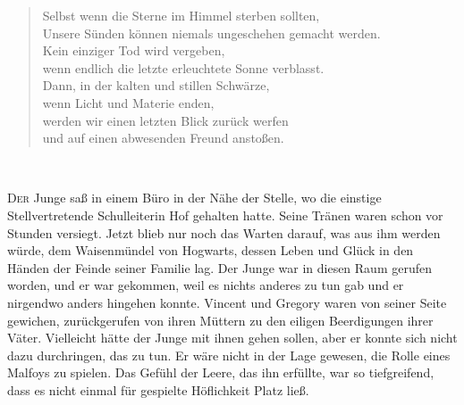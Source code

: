 \begin{chapterOpeningAuthorNote}
\begin{verse}
Selbst wenn die Sterne im Himmel sterben sollten, \\
Unsere Sünden können niemals ungeschehen gemacht werden. \\
Kein einziger Tod wird vergeben, \\
wenn endlich die letzte erleuchtete Sonne verblasst. \\
Dann, in der kalten und stillen Schwärze, \\
wenn Licht und Materie enden, \\
werden wir einen letzten Blick zurück werfen \\
und auf einen abwesenden Freund anstoßen.
\end{verse}
~
\end{chapterOpeningAuthorNote}

\lettrine{D}{er} Junge saß in einem Büro in der Nähe der Stelle, wo die einstige Stellvertretende Schulleiterin Hof gehalten hatte. Seine Tränen waren schon vor Stunden versiegt. Jetzt blieb nur noch das Warten darauf, was aus ihm werden würde, dem Waisenmündel von Hogwarts, dessen Leben und Glück in den Händen der Feinde seiner Familie lag. Der Junge war in diesen Raum gerufen worden, und er war gekommen, weil es nichts anderes zu tun gab und er nirgendwo anders hingehen konnte. Vincent und Gregory waren von seiner Seite gewichen, zurückgerufen von ihren Müttern zu den eiligen Beerdigungen ihrer Väter. Vielleicht hätte der Junge mit ihnen gehen sollen, aber er konnte sich nicht dazu durchringen, das zu tun. Er wäre nicht in der Lage gewesen, die Rolle eines Malfoys zu spielen. Das Gefühl der Leere, das ihn erfüllte, war so tiefgreifend, dass es nicht einmal für gespielte Höflichkeit Platz ließ.

